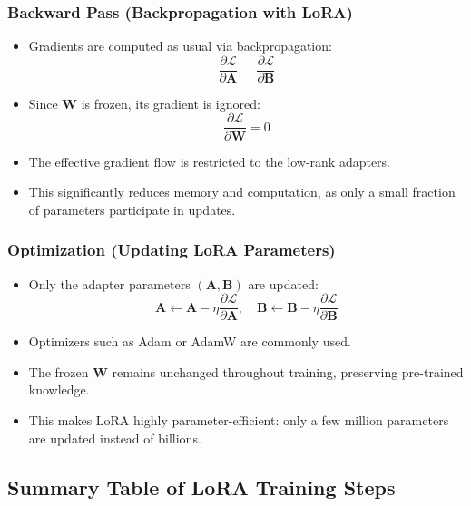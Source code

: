 \subsubsection{Backward Pass (Backpropagation with LoRA)}

\begin{itemize}
    \item Gradients are computed as usual via backpropagation:
    \[
        \frac{\partial \mathcal{L}}{\partial \mathbf{A}}, \quad \frac{\partial \mathcal{L}}{\partial \mathbf{B}}
    \]
    \item Since $\mathbf{W}$ is frozen, its gradient is ignored:
    \[
        \frac{\partial \mathcal{L}}{\partial \mathbf{W}} = 0
    \]
    \item The effective gradient flow is restricted to the low-rank adapters.
    \item This significantly reduces memory and computation, as only a small fraction of parameters participate in updates.
\end{itemize}

\subsubsection{Optimization (Updating LoRA Parameters)}

\begin{itemize}
    \item Only the adapter parameters $(\mathbf{A}, \mathbf{B})$ are updated:
    \[
        \mathbf{A} \leftarrow \mathbf{A} - \eta \frac{\partial \mathcal{L}}{\partial \mathbf{A}}, \quad
        \mathbf{B} \leftarrow \mathbf{B} - \eta \frac{\partial \mathcal{L}}{\partial \mathbf{B}}
    \]
    \item Optimizers such as Adam or AdamW are commonly used.
    \item The frozen $\mathbf{W}$ remains unchanged throughout training, preserving pre-trained knowledge.
    \item This makes LoRA highly parameter-efficient: only a few million parameters are updated instead of billions.
\end{itemize}

\subsection{Summary Table of LoRA Training Steps}

